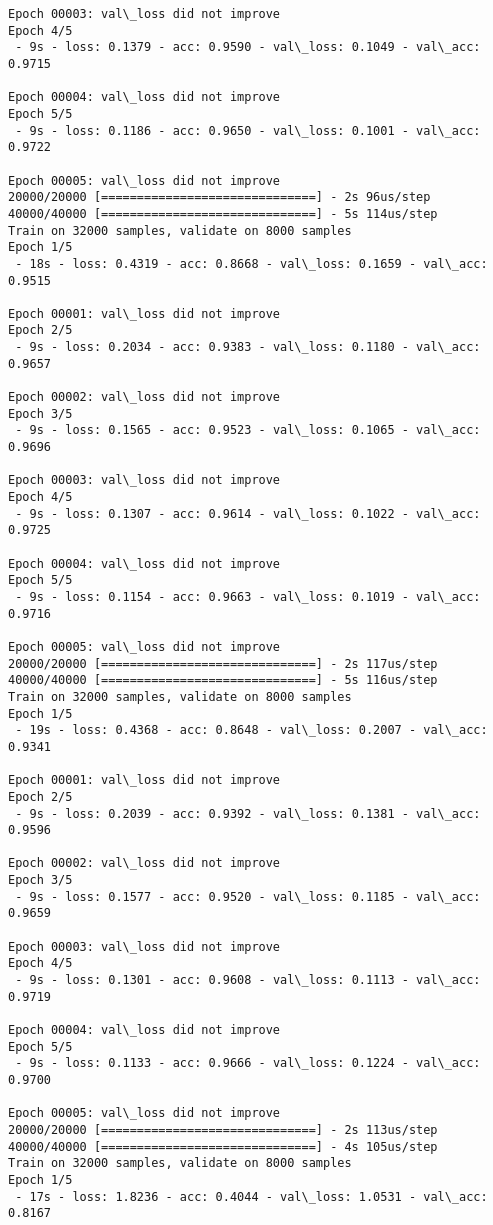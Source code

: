 \documentclass[11pt]{article}
\begin{document}
\begin{Verbatim}[commandchars=\\\{\}]
Epoch 00003: val\_loss did not improve
Epoch 4/5
 - 9s - loss: 0.1379 - acc: 0.9590 - val\_loss: 0.1049 - val\_acc: 0.9715

Epoch 00004: val\_loss did not improve
Epoch 5/5
 - 9s - loss: 0.1186 - acc: 0.9650 - val\_loss: 0.1001 - val\_acc: 0.9722

Epoch 00005: val\_loss did not improve
20000/20000 [==============================] - 2s 96us/step
40000/40000 [==============================] - 5s 114us/step
Train on 32000 samples, validate on 8000 samples
Epoch 1/5
 - 18s - loss: 0.4319 - acc: 0.8668 - val\_loss: 0.1659 - val\_acc: 0.9515

Epoch 00001: val\_loss did not improve
Epoch 2/5
 - 9s - loss: 0.2034 - acc: 0.9383 - val\_loss: 0.1180 - val\_acc: 0.9657

Epoch 00002: val\_loss did not improve
Epoch 3/5
 - 9s - loss: 0.1565 - acc: 0.9523 - val\_loss: 0.1065 - val\_acc: 0.9696

Epoch 00003: val\_loss did not improve
Epoch 4/5
 - 9s - loss: 0.1307 - acc: 0.9614 - val\_loss: 0.1022 - val\_acc: 0.9725

Epoch 00004: val\_loss did not improve
Epoch 5/5
 - 9s - loss: 0.1154 - acc: 0.9663 - val\_loss: 0.1019 - val\_acc: 0.9716

Epoch 00005: val\_loss did not improve
20000/20000 [==============================] - 2s 117us/step
40000/40000 [==============================] - 5s 116us/step
Train on 32000 samples, validate on 8000 samples
Epoch 1/5
 - 19s - loss: 0.4368 - acc: 0.8648 - val\_loss: 0.2007 - val\_acc: 0.9341

Epoch 00001: val\_loss did not improve
Epoch 2/5
 - 9s - loss: 0.2039 - acc: 0.9392 - val\_loss: 0.1381 - val\_acc: 0.9596

Epoch 00002: val\_loss did not improve
Epoch 3/5
 - 9s - loss: 0.1577 - acc: 0.9520 - val\_loss: 0.1185 - val\_acc: 0.9659

Epoch 00003: val\_loss did not improve
Epoch 4/5
 - 9s - loss: 0.1301 - acc: 0.9608 - val\_loss: 0.1113 - val\_acc: 0.9719

Epoch 00004: val\_loss did not improve
Epoch 5/5
 - 9s - loss: 0.1133 - acc: 0.9666 - val\_loss: 0.1224 - val\_acc: 0.9700

Epoch 00005: val\_loss did not improve
20000/20000 [==============================] - 2s 113us/step
40000/40000 [==============================] - 4s 105us/step
Train on 32000 samples, validate on 8000 samples
Epoch 1/5
 - 17s - loss: 1.8236 - acc: 0.4044 - val\_loss: 1.0531 - val\_acc: 0.8167


\end{Verbatim}
\end{document}
